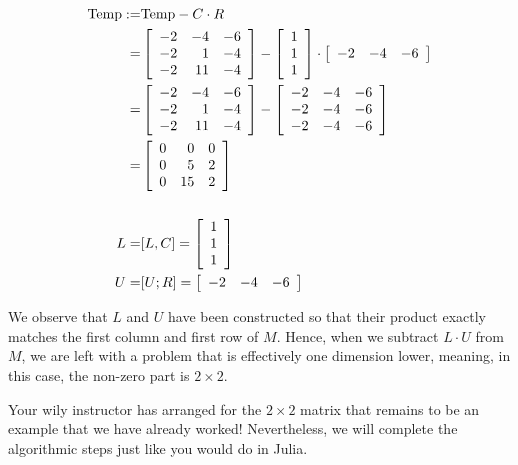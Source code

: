 \begin{align*}
    {\rm Temp}:=& {\rm Temp}-C \cdot R \\
    =& \left[\begin{array}{rrr} -2 & -4 & -6\\
-2 & 1 & -4 \\ -2 & 11 & -4 \end{array}\right] -   \left[\begin{array}{r} 1 \\ 1 \\1 \end{array} \right] \cdot  \left[\begin{array}{rrr} -2&-4 & -6 \end{array} \right] \\
=& \left[\begin{array}{rrr} -2 & -4 & -6\\
-2 & 1 & -4 \\ -2 & 11 & -4 \end{array}\right] -   \left[\begin{array}{rrr}  -2&-4 & -6 \\  -2&-4 & -6 \\  -2&-4 & -6\end{array} \right]  \\
=&  \left[\begin{array}{rrr} 0 & 0 & 0\\
0 & 5 & 2 \\ 0 & 15 & 2\end{array}\right]\\
\\
L=&[L,C] = \left[\begin{array}{r}  1 \\ 1 \\1 \end{array} \right]\\
U=&[U;R] = \left[\begin{array}{rrr}  -2&-4 & -6  \end{array} \right]
\end{align*}

\begin{tcolorbox}[sharp corners, colback=green!30, colframe=green!80!blue, title=\textbf{\large Reminder of Why LU Factorization Works}]
We observe that $L$ and $U$ have been constructed so that their product exactly matches the first column and first row of $M$.  Hence, when we subtract $L \cdot U$ from $M$, we are left with a problem that is effectively one dimension lower, meaning, in this case, the non-zero part is $2 \times 2$. 
\end{tcolorbox}
Your wily instructor has arranged for the $2 \times 2$ matrix that remains to be an example that we have already worked! Nevertheless, we will complete the algorithmic steps just like you would do in Julia.\\

